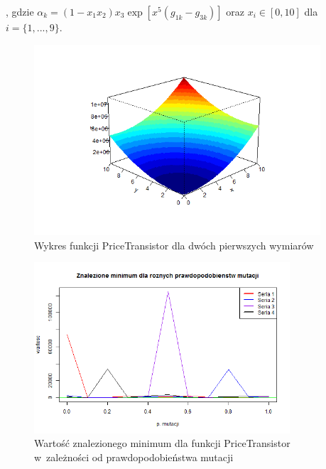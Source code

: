 \documentclass[11pt, a4paper]{article}
\begin{document}
, gdzie $ \alpha_k = (1-x_1 x_2)x_3 {\exp[ x^5 (g_{1k} - g_{3k})]}$ oraz $ x_i \in [0, 10]$ dla $i = \{1, ..., 9\}$.

\begin{figure}[H]
	\begin{center}
		\includegraphics[width=0.95\textwidth]{./assets/PriceTransistor1.png}
		\caption{Wykres funkcji PriceTransistor dla dwóch pierwszych wymiarów}
		\label{fig:pricetransistor1}
	\end{center}
\end{figure}

\begin{figure}[H]
	\begin{center}
		\includegraphics[width=0.85\textwidth]{./assets/PriceTransistor2.png}
		\caption{Wartość znalezionego minimum dla funkcji PriceTransistor w~zależności od prawdopodobieństwa mutacji}
		\label{fig:pricetransistor2}
	\end{center}
\end{figure}
\end{document}
